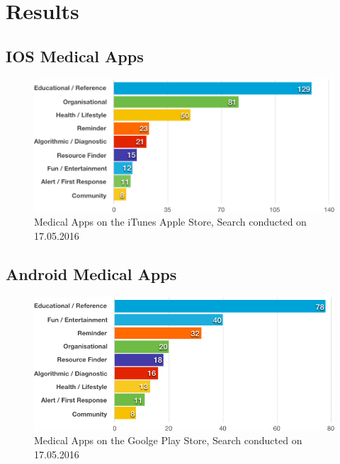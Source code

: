 \section{Results}


\subsection{IOS Medical Apps}

\begin{figure}[H]
    \centering
    \includegraphics[width=\textwidth]{assets/market_research/apple_chart1.png}
    \caption{Medical Apps on the iTunes Apple Store, Search conducted on 17.05.2016}
    \label{fig:itunes_apps}
\end{figure}


\subsection{Android Medical Apps}

\begin{figure}[H]
    \centering
    \includegraphics[width=\textwidth]{assets/market_research/android_chart.png}
    \caption{Medical Apps on the Goolge Play Store, Search conducted on 17.05.2016}
    \label{fig:itunes_apps}
\end{figure}
